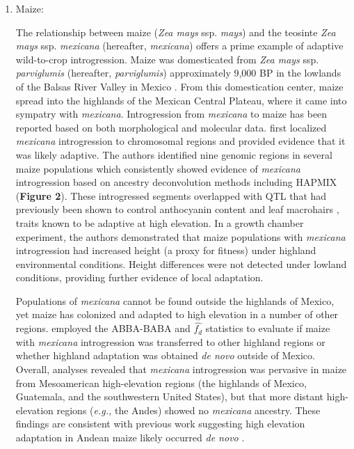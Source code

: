 \documentclass[11pt]{article}
\begin{document}
\begin{enumerate}
\item{Maize:}

The relationship between maize (\emph{Zea mays} ssp. \emph{mays}) and the teosinte \emph{Zea mays} ssp. \emph{mexicana} (hereafter, \emph{mexicana}) offers a prime example of adaptive wild-to-crop introgression.
Maize was domesticated from \emph{Zea mays} ssp. \emph{parviglumis} (hereafter, \emph{parviglumis})  approximately 9,000 BP in the lowlands of the Balsas River Valley in Mexico \citep{matsuoka2002single}.
From this domestication center, maize spread into the highlands of the Mexican Central Plateau, where it came into sympatry with \emph{mexicana}.
Introgression from \emph{mexicana} to maize has been reported based on both morphological \citep{wilkes1977} and molecular \citep{vanHeerwaarden2011, doebley1987} data.
\citet{Hufford2013} first localized \emph{mexicana} introgression to chromosomal regions and provided evidence that it was likely adaptive.
The authors identified nine genomic regions in several maize populations which consistently showed evidence of \emph{mexicana} introgression based on ancestry deconvolution methods including HAPMIX (\textbf{Figure 2}).
These introgressed segments overlapped with QTL that had previously been shown to control anthocyanin content and leaf macrohairs \citep{lauter2004}, traits known to be adaptive at high elevation.
In a growth chamber experiment, the authors demonstrated that maize populations with \emph{mexicana} introgression had increased height (a proxy for fitness) under highland environmental conditions.
Height differences were not detected under lowland conditions, providing further evidence of local adaptation.


Populations of \emph{mexicana} cannot be found outside the highlands of Mexico, yet maize has colonized and adapted to high elevation in a number of other regions.
\citet{Wang2017} employed the ABBA-BABA and $\hat{f_{d}}$ statistics to evaluate if maize with \emph{mexicana} introgression was transferred to other highland regions or whether highland adaptation was obtained \emph{de novo} outside of Mexico.
Overall, analyses revealed that  \emph{mexicana} introgression was pervasive in maize from Mesoamerican high-elevation regions (the highlands of Mexico, Guatemala, and the southwestern United States), but that more distant high-elevation regions (\emph{e.g.,} the Andes) showed no \emph{mexicana} ancestry.
These findings are consistent with previous work suggesting high elevation adaptation in Andean maize likely occurred \emph{de novo} \citep{Takuno2015}.



\end{enumerate}
\end{document}
